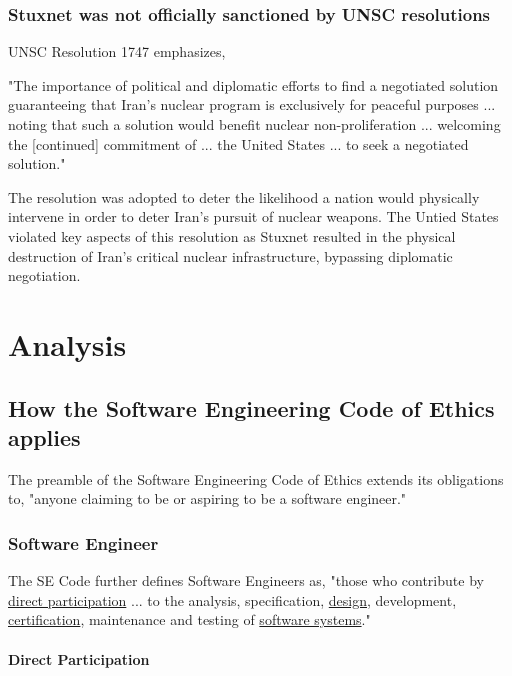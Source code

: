 \documentclass[12pt]{article}
\begin{document}
\begin{multicols}{2}
\subsubsection{Stuxnet was not officially sanctioned by UNSC resolutions}

UNSC Resolution 1747 emphasizes,
\begin{displayquote}
"The importance of political and diplomatic efforts to find a negotiated solution guaranteeing that Iran’s nuclear program is exclusively for peaceful purposes ... noting that such a solution would benefit nuclear non-proliferation ... welcoming the [continued] commitment of ... the United States ... to seek a negotiated solution."\cite{resolution1747}
\end{displayquote}

The resolution was adopted to deter the likelihood a nation would physically intervene in order to deter Iran's pursuit of nuclear weapons. The Untied States violated key aspects of this resolution as Stuxnet resulted in the physical destruction of Iran's critical nuclear infrastructure, bypassing diplomatic negotiation.


\section{Analysis}

\subsection{How the Software Engineering Code of Ethics applies}

The preamble of the Software Engineering Code of Ethics extends its obligations to, "anyone claiming to be or aspiring to be a software engineer."\cite{softwareEngineeringCodeOfEthics}

\subsubsection{Software Engineer}

The SE Code further defines Software Engineers as, "those who contribute by \underline{direct participation} ... to the analysis, specification, \underline{design}, development, \underline{certification}, maintenance and testing of \underline{software systems}."

\paragraph{Direct Participation}


\end{multicols}
\end{document}

